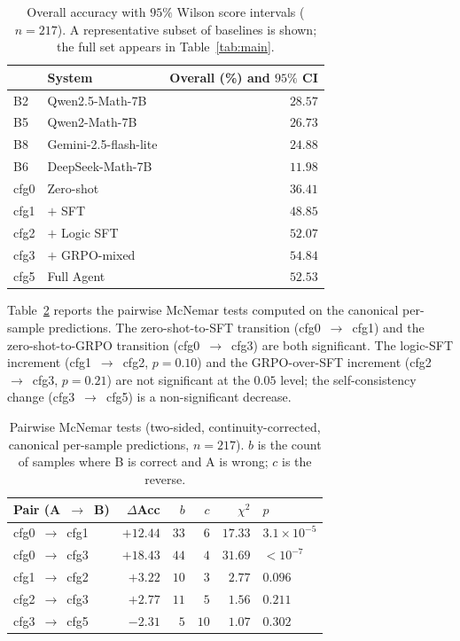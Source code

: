 \documentclass[preprint,12pt]{elsarticle}
\begin{document}
\begin{table}[t]
\centering
\caption{Overall accuracy with $95\%$ Wilson score intervals ($n=217$).
         A representative subset of baselines is shown; the full set
         appears in Table~\ref{tab:main}.}
\label{tab:ci}
\begin{tabular}{llr}
\toprule
& System & Overall (\%) and $95\%$ CI \\
\midrule
B2 & Qwen2.5-Math-7B   & $28.57$\;\;[$23.0,34.9$] \\
B5 & Qwen2-Math-7B     & $26.73$\;\;[$21.3,33.0$] \\
B8 & Gemini-2.5-flash-lite & $24.88$\;\;[$19.6,31.0$] \\
B6 & DeepSeek-Math-7B  & $11.98$\;\;[$\phantom{0}8.3,17.0$] \\
\midrule
cfg0 & Zero-shot       & $36.41$\;\;[$30.3,43.0$] \\
cfg1 & $+$ SFT          & $48.85$\;\;[$42.3,55.5$] \\
cfg2 & $+$ Logic SFT    & $52.07$\;\;[$45.4,58.6$] \\
cfg3 & $+$ GRPO-mixed   & $54.84$\;\;[$48.2,61.3$] \\
cfg5 & Full Agent       & $52.53$\;\;[$45.9,59.1$] \\
\bottomrule
\end{tabular}
\end{table}

Table~\ref{tab:mcnemar} reports the pairwise McNemar tests computed on the
canonical per-sample predictions. The zero-shot-to-SFT transition
(cfg0~$\rightarrow$~cfg1) and the zero-shot-to-GRPO transition
(cfg0~$\rightarrow$~cfg3) are both significant. The logic-SFT increment
(cfg1~$\rightarrow$~cfg2, $p=0.10$) and the GRPO-over-SFT increment
(cfg2~$\rightarrow$~cfg3, $p=0.21$) are not significant at the
$0.05$ level; the self-consistency change
(cfg3~$\rightarrow$~cfg5) is a non-significant decrease.

\begin{table}[t]
\centering
\caption{Pairwise McNemar tests (two-sided, continuity-corrected,
         canonical per-sample predictions, $n=217$). $b$ is the count of
         samples where B is correct and A is wrong; $c$ is the reverse.}
\label{tab:mcnemar}
\begin{tabular}{lrrrrl}
\toprule
Pair (A~$\rightarrow$~B) & $\Delta$Acc & $b$ & $c$ & $\chi^2$ & $p$ \\
\midrule
cfg0~$\rightarrow$~cfg1 & $+12.44$ & $33$ & $\phantom{0}6$ & $17.33$ & $3.1\times10^{-5}$ \\
cfg0~$\rightarrow$~cfg3 & $+18.43$ & $44$ & $\phantom{0}4$ & $31.69$ & $<10^{-7}$ \\
cfg1~$\rightarrow$~cfg2 & $+3.22$  & $10$ & $\phantom{0}3$ & $2.77$  & $0.096$ \\
cfg2~$\rightarrow$~cfg3 & $+2.77$  & $11$ & $\phantom{0}5$ & $1.56$  & $0.211$ \\
cfg3~$\rightarrow$~cfg5 & $-2.31$  & $\phantom{0}5$ & $10$ & $1.07$ & $0.302$ \\
\bottomrule
\end{tabular}
\end{table}
\end{document}
